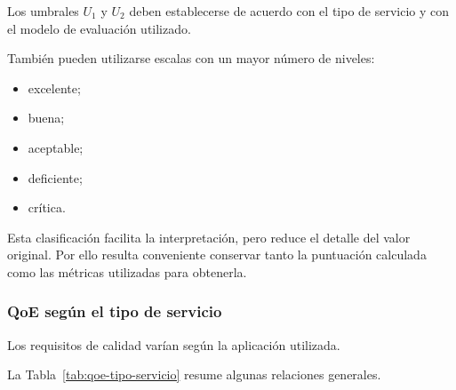 Los umbrales \(U_1\) y \(U_2\) deben establecerse de acuerdo con el tipo
de servicio y con el modelo de evaluación utilizado.

También pueden utilizarse escalas con un mayor número de niveles:

\begin{itemize}
    \item excelente;

    \item buena;

    \item aceptable;

    \item deficiente;

    \item crítica.
\end{itemize}

Esta clasificación facilita la interpretación, pero reduce el detalle
del valor original. Por ello resulta conveniente conservar tanto la
puntuación calculada como las métricas utilizadas para obtenerla.


\subsubsection*{QoE según el tipo de servicio}

Los requisitos de calidad varían según la aplicación utilizada.

La Tabla~\ref{tab:qoe-tipo-servicio} resume algunas relaciones generales.

